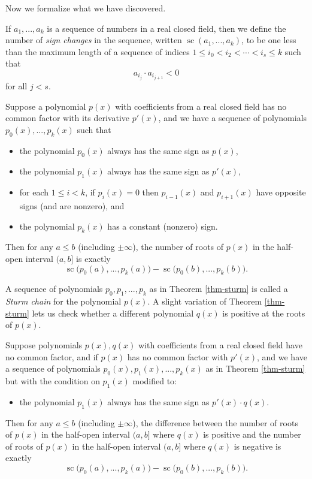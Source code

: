 Now we formalize what we have discovered.

\begin{defn} If $a_1, ..., a_k$ is a sequence of numbers in a real closed field, then we define the number of \emph{sign changes} in the sequence, written $\operatorname{sc}(a_1, ..., a_k)$, to be one less than the maximum length of a sequence of indices $1 \le i_0 < i_2 < \cdots < i_s \le k$ such that
\[
a_{i_j} \cdot a_{i_{j+1}} < 0
\]
for all $j < s$.
\end{defn}

\begin{thm}[Sturm]\label{thm-sturm} Suppose a polynomial $p(x)$ with coefficients from a real closed field has no common factor with its derivative $p'(x)$, and we have a sequence of polynomials $p_0(x), ..., p_k(x)$ such that
\begin{itemize}
\item the polynomial $p_0(x)$ always has the same sign as $p(x)$,

\item the polynomial $p_1(x)$ always has the same sign as $p'(x)$,

\item for each $1 \le i < k$, if $p_i(x) = 0$ then $p_{i-1}(x)$ and $p_{i+1}(x)$ have opposite signs (and are nonzero), and

\item the polynomial $p_k(x)$ has a constant (nonzero) sign.
\end{itemize}
Then for any $a \le b$ (including $\pm\infty$), the number of roots of $p(x)$ in the half-open interval $(a,b]$ is exactly
\[
\operatorname{sc}\big(p_0(a), ..., p_k(a)\big) - \operatorname{sc}\big(p_0(b), ..., p_k(b)\big).
\]
\end{thm}

A sequence of polynomials $p_0, p_1, ..., p_k$ as in Theorem \ref{thm-sturm} is called a \emph{Sturm chain} for the polynomial $p(x)$. A slight variation of Theorem \ref{thm-sturm} lets us check whether a different polynomial $q(x)$ is positive at the roots of $p(x)$.

\begin{thm} Suppose polynomials $p(x),q(x)$ with coefficients from a real closed field have no common factor, and if $p(x)$ has no common factor with $p'(x)$, and we have a sequence of polynomials $p_0(x), p_1(x), ..., p_k(x)$ as in Theorem \ref{thm-sturm} but with the condition on $p_1(x)$ modified to:
\begin{itemize}
\item the polynomial $p_1(x)$ always has the same sign as $p'(x) \cdot q(x)$.
\end{itemize}
Then for any $a \le b$ (including $\pm\infty$), the difference between the number of roots of $p(x)$ in the half-open interval $(a,b]$ where $q(x)$ is positive and the number of roots of $p(x)$ in the half-open interval $(a,b]$ where $q(x)$ is negative is exactly
\[
\operatorname{sc}\big(p_0(a), ..., p_k(a)\big) - \operatorname{sc}\big(p_0(b), ..., p_k(b)\big).
\]
\end{thm}


